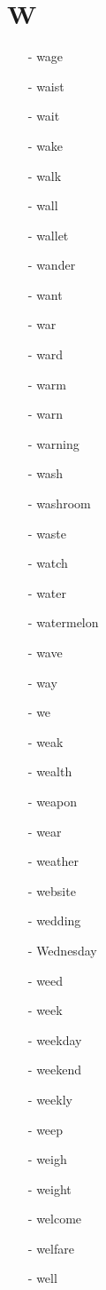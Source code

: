 \documentclass[../../book.tex]{subfiles}
\begin{document}
\section{W}
\raggedcolumns
\begin{multicols}{2}
\begin{itemize}
\item[-] wage
\item[-] waist
\item[-] wait
\item[-] wake
\item[-] walk
\item[-] wall
\item[-] wallet
\item[-] wander
\item[-] want
\item[-] war
\item[-] ward
\item[-] warm
\item[-] warn
\item[-] warning
\item[-] wash
\item[-] washroom
\item[-] waste
\item[-] watch
\item[-] water
\item[-] watermelon
\item[-] wave
\item[-] way
\item[-] we
\item[-] weak
\item[-] wealth
\item[-] weapon
\item[-] wear
\item[-] weather
\item[-] website
\item[-] wedding
\item[-] Wednesday
\item[-] weed
\item[-] week
\item[-] weekday
\item[-] weekend
\item[-] weekly
\item[-] weep
\item[-] weigh
\item[-] weight
\item[-] welcome
\item[-] welfare
\item[-] well

\end{itemize}
\end{multicols}
\end{document}
